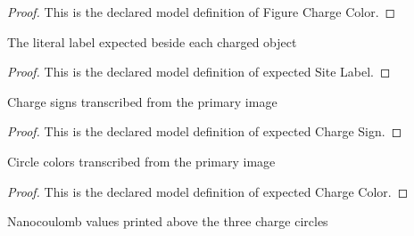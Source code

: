 \begin{proof}
  This is the declared model definition of Figure Charge Color.
\end{proof}
\begin{definition}
  \label{def:physics:phyx-mini-0892:phyxminiproblems-problemphyxmini0892-expectedsitelabel}
  The literal label expected beside each charged object
\end{definition}
\begin{proof}
  This is the declared model definition of expected Site Label.
\end{proof}
\begin{definition}
  \label{def:physics:phyx-mini-0892:phyxminiproblems-problemphyxmini0892-expectedchargesign}
  Charge signs transcribed from the primary image
\end{definition}
\begin{proof}
  This is the declared model definition of expected Charge Sign.
\end{proof}
\begin{definition}
  \label{def:physics:phyx-mini-0892:phyxminiproblems-problemphyxmini0892-expectedchargecolor}
  Circle colors transcribed from the primary image
\end{definition}
\begin{proof}
  This is the declared model definition of expected Charge Color.
\end{proof}
\begin{definition}
  \label{def:physics:phyx-mini-0892:phyxminiproblems-problemphyxmini0892-expectedchargelabelnanocoulombs}
  Nanocoulomb values printed above the three charge circles
\end{definition}
